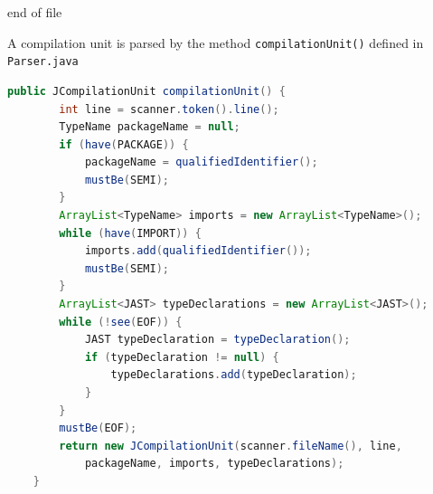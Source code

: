 \documentclass[8pt,a4paper,compress]{beamer}
\begin{document}
\begin{frame}[fragile]
\begin{overprint}
\begin{tcolorbox}[enhanced,drop shadow southwest,sharp corners,size=fbox,colback=white,fontlower=\small\ttfamily,collower=silver900]
\tcblower
\begin{minipage}[t][.2cm][t]{\textwidth}
end of file
\end{minipage}
\end{tcolorbox}
\end{overprint}
\end{frame}

\begin{frame}[fragile]
\pause

A compilation unit is parsed by the method \lstinline{compilationUnit()} defined in \lstinline{Parser.java}

\smallskip

\begin{overprint}
\begin{tcolorbox}[enhanced,drop shadow southwest,sharp corners,size=fbox,colback=white,fontlower=\small\ttfamily,collower=silver900]

\begin{lstlisting}[language=Java,style=focusin]
    public JCompilationUnit compilationUnit() {
        int line = scanner.token().line();
        TypeName packageName = null;
        if (have(PACKAGE)) {
            packageName = qualifiedIdentifier();
            mustBe(SEMI);
        }
        ArrayList<TypeName> imports = new ArrayList<TypeName>();
        while (have(IMPORT)) {
            imports.add(qualifiedIdentifier());
            mustBe(SEMI);
        }
        ArrayList<JAST> typeDeclarations = new ArrayList<JAST>();
        while (!see(EOF)) {
            JAST typeDeclaration = typeDeclaration();
            if (typeDeclaration != null) {
                typeDeclarations.add(typeDeclaration);
            }
        }
        mustBe(EOF);
        return new JCompilationUnit(scanner.fileName(), line, 
            packageName, imports, typeDeclarations);
    }
\end{lstlisting}

\tcblower
\begin{minipage}[t][.2cm][t]{\textwidth}

\end{minipage}
\end{tcolorbox}

\begin{tcolorbox}[enhanced,drop shadow southwest,sharp corners,size=fbox,colback=white,fontlower=\small\ttfamily,collower=silver900]


\end{tcolorbox}
\end{overprint}
\end{frame}
\end{document}
